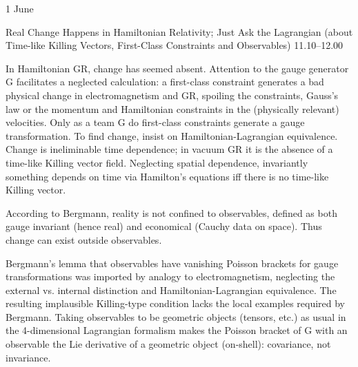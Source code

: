 \documentclass{conference}
\begin{document}
\begin{Day}{1 June}

    {Real Change Happens in Hamiltonian Relativity; Just Ask the Lagrangian (about Time-like Killing Vectors, First-Class Constraints and Observables)}
    {11.10--12.00}
    {In Hamiltonian GR, change has seemed absent.  Attention to the gauge generator G facilitates a neglected calculation:  a first-class constraint generates a bad physical change in electromagnetism and GR, spoiling the constraints, Gauss's law or the momentum and Hamiltonian constraints in the (physically relevant) velocities.  Only as a team G do first-class constraints generate a gauge transformation.  
To find change, insist on Hamiltonian-Lagrangian equivalence.  Change is ineliminable time dependence; in vacuum GR it is the absence of a time-like Killing vector field.  Neglecting spatial dependence, invariantly something depends on time via Hamilton's equations iff there is no time-like Killing vector. 

According to Bergmann, reality is not confined to observables, defined as both gauge invariant (hence real) and economical (Cauchy data on space).  Thus change can exist outside observables.

Bergmann’s lemma that observables have vanishing Poisson brackets for gauge transformations was imported by analogy to electromagnetism, neglecting the external vs. internal distinction and Hamiltonian-Lagrangian equivalence.  The resulting implausible Killing-type condition lacks the local examples required by Bergmann.  Taking observables to be geometric objects (tensors, etc.) as usual in the 4-dimensional Lagrangian formalism makes the Poisson bracket of G with an observable the Lie derivative of a geometric object (on-shell):  covariance, not invariance.}


\end{Day}
\end{document}
